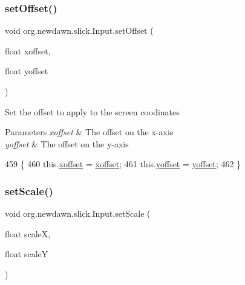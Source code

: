 \subsubsection{\texorpdfstring{set\+Offset()}{setOffset()}}
{\footnotesize\ttfamily void org.\+newdawn.\+slick.\+Input.\+set\+Offset (\begin{DoxyParamCaption}\item[{float}]{xoffset,  }\item[{float}]{yoffset }\end{DoxyParamCaption})\hspace{0.3cm}{\ttfamily [inline]}}

Set the offset to apply to the screen coodinates


\begin{DoxyParams}{Parameters}
{\em xoffset} & The offset on the x-\/axis \\
\hline
{\em yoffset} & The offset on the y-\/axis \\
\hline
\end{DoxyParams}

\begin{DoxyCode}
459                                                         \{
460         this.\mbox{\hyperlink{classorg_1_1newdawn_1_1slick_1_1_input_a51d996d444321f25398b39993bbe9dd2}{xoffset}} = \mbox{\hyperlink{classorg_1_1newdawn_1_1slick_1_1_input_a51d996d444321f25398b39993bbe9dd2}{xoffset}};
461         this.\mbox{\hyperlink{classorg_1_1newdawn_1_1slick_1_1_input_a83f7e89a50859707a59db3464a2d98a8}{yoffset}} = \mbox{\hyperlink{classorg_1_1newdawn_1_1slick_1_1_input_a83f7e89a50859707a59db3464a2d98a8}{yoffset}};
462     \}
\end{DoxyCode}
\mbox{\label{classorg_1_1newdawn_1_1slick_1_1_input_a123f4ac6d8666b016ce0e8425b998357}} 
\subsubsection{\texorpdfstring{set\+Scale()}{setScale()}}
{\footnotesize\ttfamily void org.\+newdawn.\+slick.\+Input.\+set\+Scale (\begin{DoxyParamCaption}\item[{float}]{scaleX,  }\item[{float}]{scaleY }\end{DoxyParamCaption})\hspace{0.3cm}{\ttfamily [inline]}}

